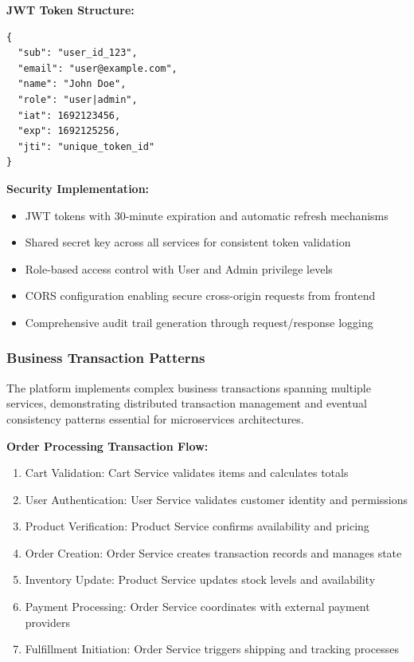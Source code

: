 \textbf{JWT Token Structure:}
\begin{verbatim}
{
  "sub": "user_id_123",
  "email": "user@example.com",
  "name": "John Doe", 
  "role": "user|admin",
  "iat": 1692123456,
  "exp": 1692125256,
  "jti": "unique_token_id"
}
\end{verbatim}

\textbf{Security Implementation:}
\begin{itemize}
\item JWT tokens with 30-minute expiration and automatic refresh mechanisms
\item Shared secret key across all services for consistent token validation
\item Role-based access control with User and Admin privilege levels
\item CORS configuration enabling secure cross-origin requests from frontend
\item Comprehensive audit trail generation through request/response logging
\end{itemize}

\subsubsection{Business Transaction Patterns}

The platform implements complex business transactions spanning multiple services, demonstrating distributed transaction management and eventual consistency patterns essential for microservices architectures.

\textbf{Order Processing Transaction Flow:}
\begin{enumerate}
\item Cart Validation: Cart Service validates items and calculates totals
\item User Authentication: User Service validates customer identity and permissions
\item Product Verification: Product Service confirms availability and pricing
\item Order Creation: Order Service creates transaction records and manages state
\item Inventory Update: Product Service updates stock levels and availability
\item Payment Processing: Order Service coordinates with external payment providers
\item Fulfillment Initiation: Order Service triggers shipping and tracking processes
\end{enumerate}

